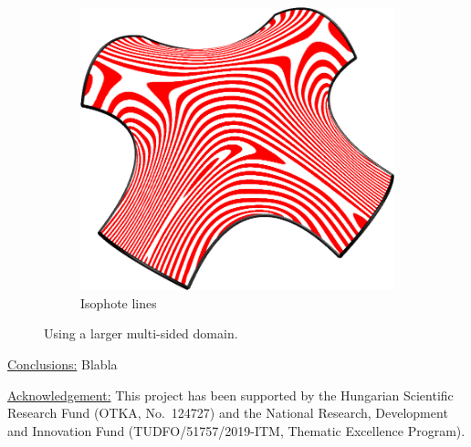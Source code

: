 \documentclass{article}
\begin{document}
\begin{figure}[h!]
\begin{subfigure}{0.3\textwidth}
    \includegraphics[width = \textwidth]{images/8sided-iso.png}
    \caption{Isophote lines}
    \label{fig:8sided-iso}
  \end{subfigure}

  \caption{Using a larger multi-sided domain.}
  \label{fig:8sided}
\end{figure}

\vspace{1em}
\noindent\underline{Conclusions:}\vspace{0.2em}\newline
Blabla

\vspace{1em}
\noindent\underline{Acknowledgement:}\vspace{0.2em}\newline
This project has been supported by the Hungarian Scientific Research Fund (OTKA, No.~124727)
and the National Research, Development and Innovation Fund
(TUDFO/51757/2019-ITM, Thematic Excellence Program).
\end{document}
